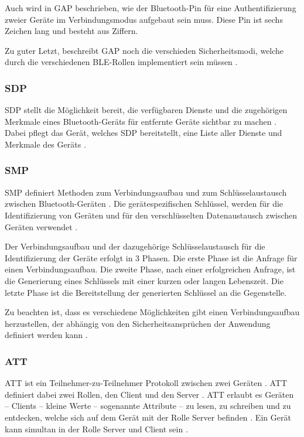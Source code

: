 Auch wird in \ac{GAP} beschrieben, wie der Bluetooth-Pin für eine Authentifizierung zweier Geräte im Verbindungsmodus aufgebaut sein muss. Diese Pin ist sechs Zeichen lang und besteht aus Ziffern. \cite[S.~1253]{bluetoothCore}

Zu guter Letzt, beschreibt \ac{GAP} noch die verschieden Sicherheitsmodi, welche durch die verschiedenen \ac{BLE}-Rollen implementiert sein müssen \cite[S.~1337]{bluetoothCore}.

\subsubsection{\acf{SDP}}
\ac{SDP} stellt die Möglichkeit bereit, die verfügbaren Dienste und die zugehörigen Merkmale eines Bluetooth-Geräts für entfernte Geräte sichtbar zu machen \cite[S.~1173]{bluetoothCore}. Dabei pflegt das Gerät, welches \ac{SDP} bereitstellt, eine Liste aller Dienste und Merkmale des Geräts \cite[S.~1177]{bluetoothCore}.

\subsubsection{\acf{SMP}}
\ac{SMP} definiert Methoden zum Verbindungsaufbau und zum Schlüsselaustausch zwischen Bluetooth-Geräten \cite[S.~1554]{bluetoothCore}. Die gerätespezifischen Schlüssel, werden für die Identifizierung von Geräten und für den verschlüsselten Datenaustausch zwischen Geräten verwendet \cites[S.~1556]{bluetoothCore}[S.~18]{siliconBLE}.

Der Verbindungsaufbau und der dazugehörige Schlüsselaustausch für die Identifizierung der Geräte erfolgt in 3 Phasen. Die erste Phase ist die Anfrage für einen Verbindungsaufbau. Die zweite Phase, nach einer erfolgreichen Anfrage, ist die Generierung eines Schlüssels mit einer kurzen oder langen Lebenszeit. Die letzte Phase ist die Bereitstellung der generierten Schlüssel an die Gegenstelle. \cite[S.~1556]{bluetoothCore}

Zu beachten ist, dass es verschiedene Möglichkeiten gibt einen Verbindungsaufbau herzustellen, der abhängig von den Sicherheitsansprüchen der Anwendung definiert werden kann \cite[S.~18]{siliconBLE}.

\subsubsection{\acf{ATT}}
\ac{ATT} ist ein Teilnehmer-zu-Teilnehmer Protokoll zwischen zwei Geräten \cite[S.~206]{bluetoothCore}. \ac{ATT} definiert dabei zwei Rollen, den Client und den Server \cite[S.~1410]{bluetoothCore}. \ac{ATT} erlaubt es Geräten -- Clients -- kleine Werte -- sogenannte Attribute \cite[S.~279]{bluetoothCore} -- zu lesen, zu schreiben und zu entdecken, welche sich auf dem Gerät mit der Rolle Server befinden \cite[S.~1409]{bluetoothCore}. Ein Gerät kann simultan in der Rolle Server und Client sein \cite[S.~279]{bluetoothCore}.

